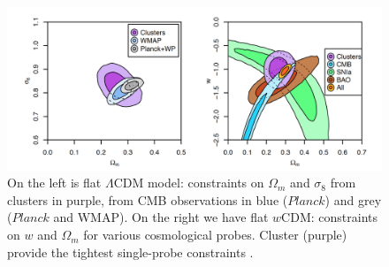 \begin{figure}[htbp]
\includegraphics[width = \columnwidth]{figs/cosmology.png}
\caption{On the left is flat $\Lambda$CDM model: constraints on $\Omega_{m}$ and $\sigma_{8}$ from clusters in purple, from CMB observations in blue ($Planck$) and grey ($Planck$ and WMAP). On the right we have flat $w$CDM: constraints on $w$ and $\Omega_{m}$ for various cosmological probes. Cluster (purple) provide the tightest single-probe constraints \citep{mantz15}.  }
\label{clustercosmology}
\end{figure}
